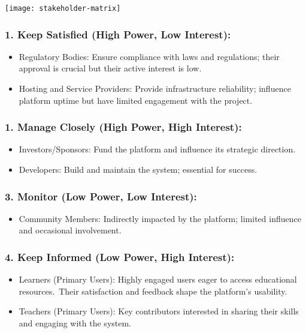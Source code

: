 \texttt{[image: stakeholder-matrix]}

\subsubsection*{1. Keep Satisfied (High Power, Low Interest):}
\begin{itemize}
\item Regulatory Bodies: Ensure compliance with laws and regulations; their approval is crucial but their active interest is low.
\item Hosting and Service Providers: Provide infrastructure reliability; influence platform uptime but have limited engagement with the project.
\end{itemize}

\subsubsection*{1. Manage Closely (High Power, High Interest):}
\begin{itemize}
\item Investors/Sponsors: Fund the platform and influence its strategic direction.
\item Developers: Build and maintain the system; essential for success.
\end{itemize}

\subsubsection*{3. Monitor (Low Power, Low Interest):}
\begin{itemize}
\item Community Members: Indirectly impacted by the platform; limited influence and occasional involvement.
\end{itemize}

\subsubsection*{4. Keep Informed (Low Power, High Interest):}
\begin{itemize}
\item Learners (Primary Users): Highly engaged users eager to access educational resources.\ Their satisfaction and feedback shape the platform’s usability.
\item Teachers (Primary Users): Key contributors interested in sharing their skills and engaging with the system.
\end{itemize}

